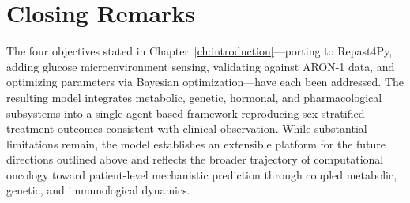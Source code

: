 \section{Closing Remarks}
\label{sec:closing-remarks}

The four objectives stated in Chapter~\ref{ch:introduction}---porting to Repast4Py, adding glucose microenvironment sensing, validating against ARON-1 data, and optimizing parameters via Bayesian optimization---have each been addressed. The resulting model integrates metabolic, genetic, hormonal, and pharmacological subsystems into a single agent-based framework reproducing sex-stratified treatment outcomes consistent with clinical observation. While substantial limitations remain, the model establishes an extensible platform for the future directions outlined above and reflects the broader trajectory of computational oncology toward patient-level mechanistic prediction through coupled metabolic, genetic, and immunological dynamics.
